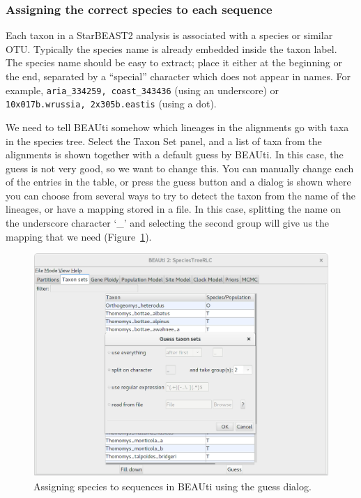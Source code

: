 \documentclass{article}
\begin{document}
\clearpage

\subsubsection*{Assigning the correct species to each sequence}

Each taxon in a StarBEAST2 analysis is associated with a species or similar OTU.
Typically the species name is already embedded inside the taxon label. The
species name should be easy to extract; place it either at the beginning or the
end, separated by a ``special'' character which does not appear in names. For
example, \texttt{aria\_334259, coast\_343436} (using an underscore) or
\texttt{10x017b.wrussia, 2x305b.eastis} (using a dot).

We need to tell BEAUti somehow which lineages in the alignments go with taxa in
the species tree. Select the Taxon Set panel, and a list of taxa from the
alignments is shown together with a default guess by BEAUti. In this case, the
guess is not very good, so we want to change this. You can manually change each
of the entries in the table, or press the guess button and a dialog is shown
where you can choose from several ways to try to detect the taxon from the name
of the lineages, or have a mapping stored in a file. In this case, splitting the
name on the underscore character `\_' and selecting the second group will give
us the mapping that we need (Figure~\ref{fig:taxonSets}).

\begin{figure}[htb!]
\centering
\includegraphics[width=\textwidth]{figures/beauti-guess.png}
\caption{Assigning species to sequences in BEAUti using the guess dialog.}
\label{fig:taxonSets}
\end{figure}
\end{document}
